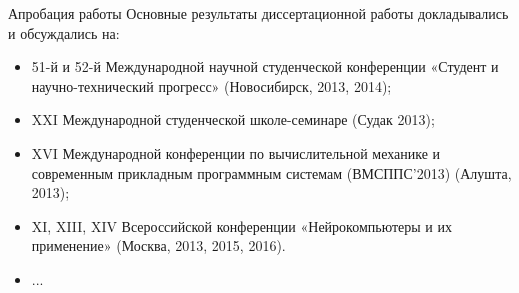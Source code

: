 \documentclass{.local/lib/classes/ndvr-super-article-standalone}
\begin{document}
    \begin{description-item}{Апробация работы}
        Основные результаты диссертационной работы докладывались 
        и обсуждались на:
        \begin{itemize}
            \item   51-й и 52-й Международной научной 
                    студенческой конференции 
                    «Студент и научно-технический прогресс» 
                    (Новосибирск, 2013, 2014);
            \item   XXI Международной студенческой 
                    школе-семинаре (Судак 2013);
            \item   XVI Международной конференции 
                    по вычислительной механике 
                    и современным прикладным программным системам 
                    (ВМСППС’2013) (Алушта, 2013);
            \item   XI, XIII, XIV Всероссийской конференции 
                    «Нейрокомпьютеры и их применение»
                    (Москва, 2013, 2015, 2016).
            \item   ...
        \end{itemize} 
    \end{description-item}
\end{document}
